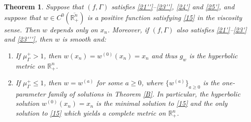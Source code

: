 \documentclass[12pt]{article}
\numberwithin{equation}{section}
\theoremstyle{plain}
\newtheorem{thm}{Theorem}[section]
\theoremstyle{definition}
\begin{document}
\begin{thm}\label{A}
	Suppose that $(f,\Gamma)$ satisfies \eqref{21''}--\eqref{23''}, \eqref{24'} and \eqref{25'}, and suppose that $w\in C^0(\overline{\mathbb{R}_+^n})$ is a positive function satisfying \eqref{15} in the viscosity sense. Then $w$ depends only on $x_n$. Moreover, if $(f,\Gamma)$ also satisfies \eqref{21'}--\eqref{23'} and \eqref{23'''}, then $w$ is smooth and:\medskip
	\begin{enumerate}
		\item If $\mu_\Gamma^+ > 1$, then $w(x_n) = w^{(0)}(x_n) = x_n$ and thus $g_w$ is the hyperbolic metric on $\mathbb{R}_+^n$.\medskip
		\item If $\mu_\Gamma^+ \leq 1$, then $w=w^{(a)}$ for some $a \geq 0$, where $\{w^{(a)}\}_{a\geq 0}$ is the one-parameter family of solutions in Theorem \ref{B}. In particular, the hyperbolic solution $w^{(0)}(x_n) = x_n$ is the minimal solution to \eqref{15} and the only solution to \eqref{15} which yields a complete metric on $\mathbb{R}_+^n$.
	\end{enumerate}
\end{thm}
\end{document}
